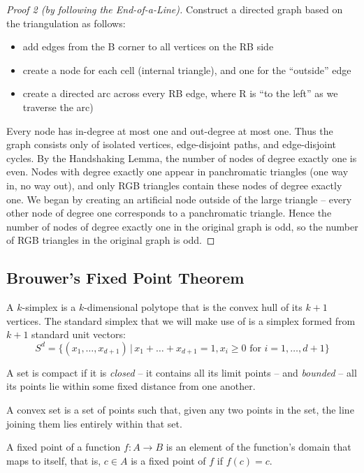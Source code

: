 \begin{proof}[Proof 2 \emph{(by following the End-of-a-Line)}]
	Construct a directed graph based on the triangulation as follows:
	\begin{itemize}
		\item add edges from the B corner to all vertices on the RB side
		\item create a node for each cell (internal triangle), and one for
			the ``outside'' edge
		\item create a directed arc across every RB edge, where R is ``to
			the left'' as we traverse the arc)
	\end{itemize}

	Every node has in-degree at most one and out-degree at most one. Thus the
	graph consists only of isolated vertices, edge-disjoint paths, and
	edge-disjoint cycles. By the Handshaking Lemma, the number of nodes of
	degree exactly one is even. Nodes with degree exactly one appear in
	panchromatic triangles (one way in, no way out), and only RGB triangles
	contain these nodes of degree exactly one. We began by creating an
	artificial node outside of the large triangle -- every other node of degree
	one corresponds to a panchromatic triangle. Hence the number of nodes of
	degree exactly one in the original graph is odd, so the number of RGB
	triangles in the original graph is odd.
\end{proof}

\subsection{Brouwer's Fixed Point Theorem}

A $k$-simplex is a $k$-dimensional polytope that is the convex hull of its
$k+1$ vertices. The standard simplex that we will make use of is a simplex
formed from $k+1$ standard unit vectors:
\begin{equation}
	S^d = \{ (x_1, \ldots, x_{d+1}) \, | \, x_1 + \ldots + x_{d+1} = 1, x_i
	\ge 0 \text{ for } i = 1, \ldots, d+1 \}
\end{equation}

A set is compact if it is \textit{closed} -- it contains all its limit points
-- and \textit{bounded} -- all its points lie within some fixed distance from
one another.

A convex set is a set of points such that, given any two points in the set, the
line joining them lies entirely within that set.

A fixed point of a function $f: A \rightarrow B$ is an element of the
function's domain that maps to itself, that is, $c \in A$ is a fixed point of
$f$ if $f(c) = c$.

